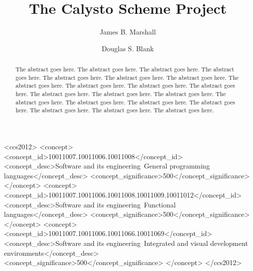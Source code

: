 \documentclass[acmsmall,screen,authorversion]{acmart}
\begin{document}
\title[Calysto Scheme]{The Calysto Scheme Project}

\author{James B. Marshall}

\author{Douglas S. Blank}
\authornotemark[1]

\renewcommand{\shortauthors}{D. S. Blank and J. B. Marshall}

\begin{abstract}
The abstract goes here. The abstract goes here. The abstract goes here. The
abstract goes here. The abstract goes here. The abstract goes here. The
abstract goes here. The abstract goes here. The abstract goes here. The
abstract goes here. The abstract goes here. The abstract goes here. The
abstract goes here. The abstract goes here. The abstract goes here. The
abstract goes here. The abstract goes here. The abstract goes here. The
abstract goes here. The abstract goes here. The abstract goes here.
\end{abstract}

\begin{CCSXML}
<ccs2012>
<concept>
<concept_id>10011007.10011006.10011008</concept_id>
<concept_desc>Software and its engineering~General programming languages</concept_desc>
<concept_significance>500</concept_significance>
</concept>
<concept>
<concept_id>10011007.10011006.10011008.10011009.10011012</concept_id>
<concept_desc>Software and its engineering~Functional languages</concept_desc>
<concept_significance>500</concept_significance>
</concept>
<concept>
<concept_id>10011007.10011006.10011066.10011069</concept_id>
<concept_desc>Software and its engineering~Integrated and visual development environments</concept_desc>
<concept_significance>500</concept_significance>
</concept>
</ccs2012>
\end{CCSXML}
\end{document}
